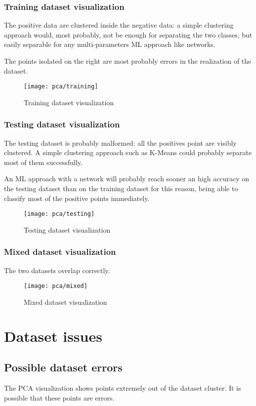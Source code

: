 \subsection{Training dataset visualization}
The positive data are clustered inside the negative data: a simple clustering approach would, most probably, not be enough for separating the two classes, but easily separable for any multi-parameters ML approach like networks.

The points isolated on the right are most probably errors in the realization of the dataset.

\begin{figure}
	\texttt{[image: pca/training]}
	\caption{Training dataset visualization}
\end{figure}

\subsection{Testing dataset visualization}
The testing dataset is probably malformed: all the positives point are visibly clustered. A simple clustering approach such as K-Means could probably separate most of them successfully.

An ML approach with a network will probably reach sooner an high accuracy on the testing dataset than on the training dataset for this reason, being able to classify most of the positive points immediately.

\begin{figure}
	\texttt{[image: pca/testing]}
	\caption{Testing dataset visualization}
\end{figure}

\subsection{Mixed dataset visualization}
The two datasets overlap correctly.
\begin{figure}
	\texttt{[image: pca/mixed]}
	\caption{Mixed dataset visualization}
\end{figure}

\chapter{Dataset issues}

\section{Possible dataset errors}
The PCA visualization shows points extremely out of the dataset cluster. It is possible that these points are errors.

